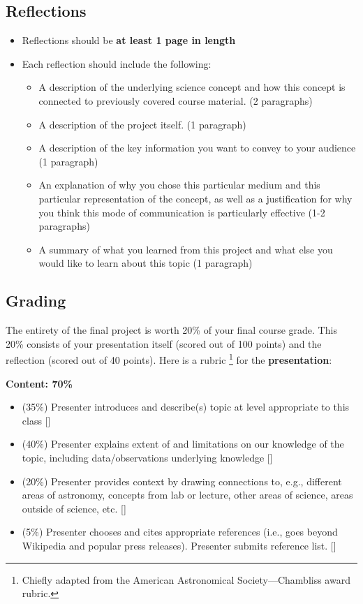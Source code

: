 \documentclass[11pt]{article}
\begin{document}
\subsection*{Reflections}
\begin{itemize}[noitemsep]
    \item Reflections should be \textbf{at least 1 page in length}
    \item Each reflection should include the following:
    \begin{itemize}
        \item A description of the underlying science concept and how this concept is connected to previously covered course material. (2 paragraphs)
        \item A description of the project itself. (1 paragraph)
        \item A description of the key information you want to convey to your audience (1 paragraph)
        \item An explanation of why you chose this particular medium and this particular representation of the concept, as well as a justification for why you think this mode of communication is particularly effective (1-2 paragraphs)
        \item A summary of what you learned from this project and what else you would like to learn about this topic (1 paragraph)

    \end{itemize}
\end{itemize}

\subsection*{Grading}
The entirety of the final project is worth 20\% of your final course grade. This 20\% consists of your presentation itself (scored out of 100 points) and the reflection (scored out of 40 points). Here is a rubric \footnote{Chiefly adapted from the American Astronomical Society---Chambliss award rubric.} for the \textbf{presentation}: \bigskip

\noindent
\textbf{Content: 70\%}
\begin{itemize}
\item (35\%) Presenter introduces and describe(s) topic at level appropriate to this class [\underline{\hspace{5mm}}]
\item (40\%) Presenter explains extent of and limitations on our knowledge of the topic, including data/observations underlying knowledge [\underline{\hspace{5mm}}]
\item (20\%) Presenter provides context by drawing connections to, e.g., different areas of astronomy, concepts from lab or
lecture, other areas of science, areas outside of science, etc. [\underline{\hspace{5mm}}]
\item (5\%) Presenter chooses and cites appropriate references (i.e., goes beyond Wikipedia and popular press releases).  Presenter submits reference list. [\underline{\hspace{5mm}}]
\end{itemize} 
\end{document}
